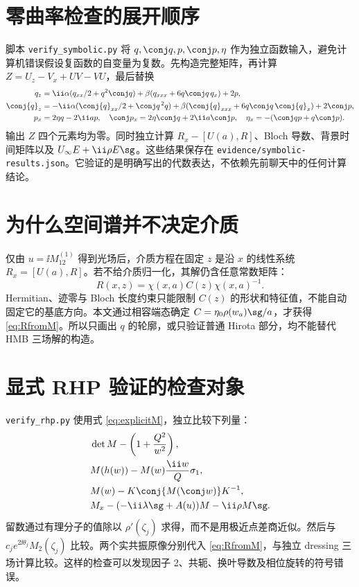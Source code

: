 \section{零曲率检查的展开顺序}
脚本 \texttt{verify\_symbolic.py} 将 $q,\conj q,p,\conj p,\eta$ 作为独立函数输入，避免计算机错误假设复函数的自变量为复数。先构造完整矩阵，再计算
$Z=U_z-V_x+UV-VU$，最后替换
\begin{align*}
q_z&=\ii\alpha(q_{xx}/2+q^2\conj q)
+\beta(q_{xxx}+6q\conj q\,q_x)+2p,\\
\conj{q}_z&=-\ii\alpha(\conj{q}_{xx}/2+\conj q^{\,2}q)
+\beta(\conj{q}_{xxx}+6q\conj q\,\conj{q}_x)+2\conj p,\\
p_x&=2\eta q-2\ii ap,\quad
\conj p_x=2\eta\conj q+2\ii a\conj p,\quad
\eta_x=-(\conj q p+q\conj p).
\end{align*}
输出 $Z$ 四个元素均为零。同时独立计算 $R_x-[U(a),R]$、Bloch 导数、背景时间矩阵以及 $U_\infty E+\ii\rho E\sg$。这些结果保存在
\texttt{evidence/symbolic-results.json}。它验证的是明确写出的代数表达，不依赖先前聊天中的任何计算结论。

\section{为什么空间谱并不决定介质}
仅由 $u=\ii M^{(1)}_{12}$ 得到光场后，介质方程在固定 $z$ 是沿 $x$ 的线性系统
$R_x=[U(a),R]$。若不给介质归一化，其解仍含任意常数矩阵：
\[
R(x,z)=\chi(x,a)C(z)\chi(x,a)^{-1}.
\]
Hermitian、迹零与 Bloch 长度约束只能限制 $C(z)$ 的形状和特征值，不能自动固定它的基底方向。本文通过相容端态确定
$C=\eta_0\rho(w_a)\sg/a$，才获得 \eqref{eq:RfromM}。所以只画出 $q$ 的轮廓，或只验证普通 Hirota 部分，均不能替代 HMB 三场解的构造。

\section{显式 RHP 验证的检查对象}
\texttt{verify\_rhp.py} 使用式 \eqref{eq:explicitM}，独立比较下列量：
\begin{align*}
&\det M-\left(1+\dfrac{Q^2}{w^2}\right),\\
&M(h(w))-M(w)\dfrac{\ii w}{Q}\sigma_1,\\
&M(w)-K\conj{M(\conj w)}K^{-1},\\
&M_x-(-\ii\lambda\sg+A(u))M-\ii\rho M\sg.
\end{align*}
留数通过有理分子的值除以 $\rho'(\zeta_j)$ 求得，而不是用极近点差商近似。然后与 $c_je^{2\ii\theta_j}M_2(\zeta_j)$ 比较。两个实共振原像分别代入 \eqref{eq:RfromM}，与独立 dressing 三场计算比较。这样的检查可以发现因子 2、共轭、换叶导数及相位旋转的符号错误。

